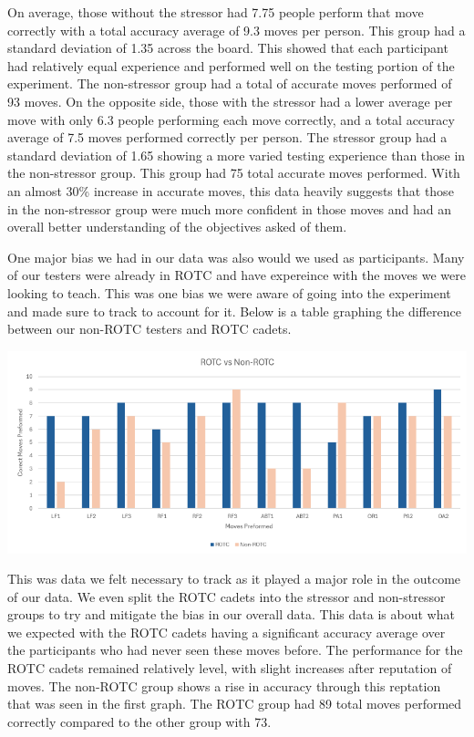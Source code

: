 \documentclass[manuscript,screen,review]{acmart}
\begin{document}
On average, those without the stressor had 7.75 people perform that move correctly with a total accuracy average of 
9.3 moves per person. This group had a standard deviation of 1.35 across the board. This showed that each participant 
had relatively equal experience and performed well on the testing portion of the experiment. The non-stressor group 
had a total of accurate moves performed of 93 moves. On the opposite side, those with the stressor had a lower average 
per move with only 6.3 people performing each move correctly, and a total accuracy average of 7.5 moves performed 
correctly per person. The stressor group had a standard deviation of 1.65 showing a more varied testing experience 
than those in the non-stressor group. This group had 75 total accurate moves performed. With an almost 30\% 
increase in accurate moves, this data heavily suggests that those in the non-stressor group were much more confident 
in those moves and had an overall better understanding of the objectives asked of them.  

One major bias we had in our data was also would we used as participants. Many of our testers were already in ROTC 
and have expereince with the moves we were looking to teach. This was one bias we were aware of going into the 
experiment and made sure to track to account for it. Below is a table graphing the difference between our non-ROTC 
testers and ROTC cadets.

\includegraphics[scale=0.8]{ROTCGraph}

This was data we felt necessary to track as it played a major role in the outcome of our data. We even split the 
ROTC cadets into the stressor and non-stressor groups to try and mitigate the bias in our overall data. This data 
is about what we expected with the ROTC cadets having a significant accuracy average over the participants who had 
never seen these moves before. The performance for the ROTC cadets remained relatively level, with slight increases 
after reputation of moves. The non-ROTC group shows a rise in accuracy through this reptation that was seen in 
the first graph. The ROTC group had 89 total moves performed correctly compared to the other group with 73.   
\end{document}
